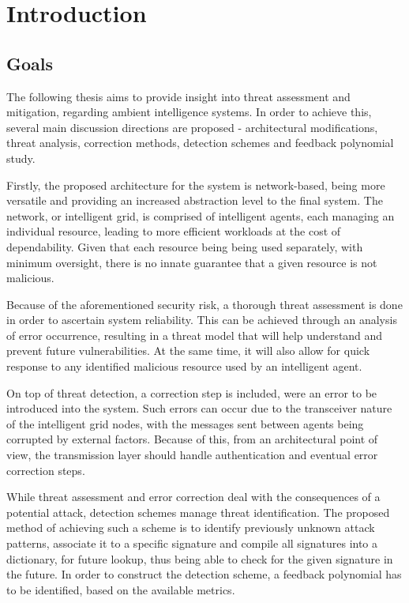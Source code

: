 \chapter{Introduction}

\section{Goals}

The following thesis aims to provide insight into threat assessment and mitigation, regarding ambient intelligence systems.
In order to achieve this, several main discussion directions are proposed - architectural modifications, threat analysis, correction
methods, detection schemes and feedback polynomial study.

Firstly, the proposed architecture for the system is network-based, being more versatile and providing an increased abstraction level
to the final system. The network, or intelligent grid, is comprised of intelligent agents, each managing an individual resource, leading
to more efficient workloads at the cost of dependability. Given that each resource being being used separately, with minimum oversight,
there is no innate guarantee that a given resource is not malicious.

Because of the aforementioned security risk, a thorough threat assessment is done in order to ascertain system reliability. This can
be achieved through an analysis of error occurrence, resulting in a threat model that will help understand and prevent future vulnerabilities.
At the same time, it will also allow for quick response to any identified malicious resource used by an intelligent agent.

On top of threat detection, a correction step is included, were an error to be introduced into the system. Such errors can occur due to
the transceiver nature of the intelligent grid nodes, with the messages sent between agents being corrupted by external factors. Because of
this, from an architectural point of view, the transmission layer should handle authentication and eventual error correction steps.

While threat assessment and error correction deal with the consequences of a potential attack, detection schemes manage threat identification.
The proposed method of achieving such a scheme is to identify previously unknown attack patterns, associate it to a specific signature and
compile all signatures into a dictionary, for future lookup, thus being able to check for the given signature in the future. In order to
construct the detection scheme, a feedback polynomial has to be identified, based on the available metrics.

